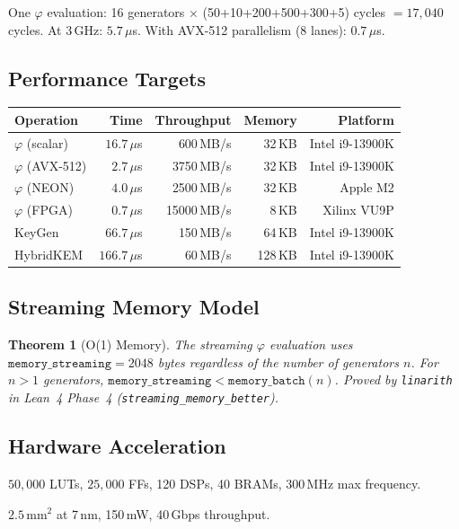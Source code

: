 \documentclass[11pt,letterpaper]{article}
\newtheorem{theorem}{Theorem}[section]
\theoremstyle{definition}
\begin{document}
One $\varphi$ evaluation: 16 generators $\times$ (50+10+200+500+300+5) cycles
$= 17{,}040$ cycles.  At 3\,GHz: $5.7\,\mu$s. With AVX-512 parallelism (8 lanes):
$0.7\,\mu$s.

\subsection{Performance Targets}

\begin{center}
\begin{tabular}{lrrrr}
\toprule
Operation & Time & Throughput & Memory & Platform \\
\midrule
$\varphi$ (scalar) & $16.7\,\mu$s & 600\,MB/s & 32\,KB & Intel i9-13900K \\
$\varphi$ (AVX-512) & $2.7\,\mu$s & 3750\,MB/s & 32\,KB & Intel i9-13900K \\
$\varphi$ (NEON) & $4.0\,\mu$s & 2500\,MB/s & 32\,KB & Apple M2 \\
$\varphi$ (FPGA) & $0.7\,\mu$s & 15000\,MB/s & 8\,KB & Xilinx VU9P \\
KeyGen & $66.7\,\mu$s & 150\,MB/s & 64\,KB & Intel i9-13900K \\
HybridKEM & $166.7\,\mu$s & 60\,MB/s & 128\,KB & Intel i9-13900K \\
\bottomrule
\end{tabular}
\end{center}

\subsection{Streaming Memory Model}

\begin{theorem}[O(1) Memory]
The streaming $\varphi$ evaluation uses $\mathtt{memory\_streaming} = 2048$
bytes regardless of the number of generators $n$.
For $n > 1$ generators, $\mathtt{memory\_streaming} < \mathtt{memory\_batch}(n)$.
\textit{Proved by} \texttt{linarith} \textit{in Lean~4 Phase~4
(\texttt{streaming\_memory\_better})}.
\end{theorem}

\subsection{Hardware Acceleration}

\begin{description}[nosep]
\item[FPGA (PolarFire MPF300T)] $50{,}000$ LUTs, $25{,}000$ FFs, 120 DSPs,
  40 BRAMs, 300\,MHz max frequency.
\item[ASIC estimate] $2.5\,\mathrm{mm}^2$ at 7\,nm, 150\,mW, 40\,Gbps throughput.
\end{description}
\end{document}
